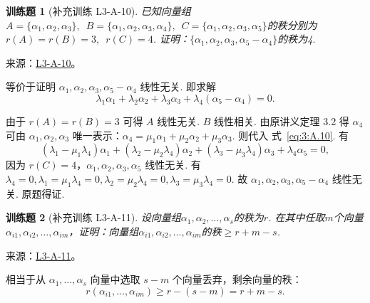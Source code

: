 \documentclass[UTF8,12pt,a4paper,fontset=fandol]{ctexart}
\newtheorem{exercise}{训练题}[section]
\begin{document}
\begin{exercise}[补充训练 L3-A-10]\label{prob:L3-A-10}
已知向量组$A=\{\alpha_1,\alpha_2,\alpha_3\},\enspace B=\{\alpha_1,\alpha_2,\alpha_3,\alpha_4\},\enspace C=\{\alpha_1,\alpha_2,\alpha_3,\alpha_5\}$的秩分别为$r(A)=r(B)=3,\enspace r(C)=4$. 证明：$\{\alpha_1,\alpha_2,\alpha_3,\alpha_5-\alpha_4\}$的秩为4.
\end{exercise}
\noindent 来源：\href{https://github.com/yhwu-is/Linear-Algebra-Left-Undone/blob/new/%E8%AE%B2%E4%B9%89/%E4%B8%93%E9%A2%98/3%20%E6%9C%89%E9%99%90%E7%BB%B4%E7%BA%BF%E6%80%A7%E7%A9%BA%E9%97%B4.tex}{L3-A-10}。
\begin{solve}
等价于证明 $\alpha_1,\alpha_2,\alpha_3,\alpha_5-\alpha_4$ 线性无关. 即求解
            \begin{equation}
                \lambda_1\alpha_1+\lambda_2\alpha_2+\lambda_3\alpha_3+\lambda_4(\alpha_5-\alpha_4)=0. \tag{*} \label{eq:3:A.10}
            \end{equation}

            由于 $r(A)=r(B)=3$ 可得 $A$ 线性无关. $B$ 线性相关. 由原讲义定理 3.2 得 $\alpha_4$ 可由 $\alpha_1,\alpha_2,\alpha_3$ 唯一表示：$\alpha_4=\mu_1\alpha_1+\mu_2\alpha_2+\mu_3\alpha_3$. 则代入 式~\eqref{eq:3:A.10}. 有
            \[(\lambda_1-\mu_1\lambda_4)\alpha_1+(\lambda_2-\mu_2\lambda_4)\alpha_2+(\lambda_3-\mu_3\lambda_4)\alpha_3+\lambda_4\alpha_5=0,\]
            因为 $r(C)=4$，$\alpha_1,\alpha_2,\alpha_3,\alpha_5$ 线性无关. 有 $\lambda_4=0,\lambda_1=\mu_1\lambda_4=0,\lambda_2=\mu_2\lambda_4=0,\lambda_3=\mu_3\lambda_4=0$. 故 $\alpha_1,\alpha_2,\alpha_3,\alpha_5-\alpha_4$ 线性无关. 原题得证.
\end{solve}

\begin{exercise}[补充训练 L3-A-11]\label{prob:L3-A-11}
设向量组$\alpha_1,\alpha_2,\ldots,\alpha_s$的秩为$r$. 在其中任取$m$个向量$\alpha_{i1},\alpha_{i2},\ldots,\alpha_{im}$，证明：向量组$\alpha_{i1},\alpha_{i2},\ldots,\alpha_{im}$的秩$\geqslant r+m-s$.
\end{exercise}
\noindent 来源：\href{https://github.com/yhwu-is/Linear-Algebra-Left-Undone/blob/new/%E8%AE%B2%E4%B9%89/%E4%B8%93%E9%A2%98/3%20%E6%9C%89%E9%99%90%E7%BB%B4%E7%BA%BF%E6%80%A7%E7%A9%BA%E9%97%B4.tex}{L3-A-11}。
\begin{solve}
相当于从 $\alpha_1,\ldots,\alpha_s$ 向量中选取 $s-m$ 个向量丢弃，剩余向量的秩：
            \[r(\alpha_{i1},\ldots,\alpha_{im})\geqslant r-(s-m) =r+m-s.\]
\end{solve}
\end{document}
